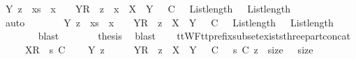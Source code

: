 \begin{isabellebody}
\ {\isachardoublequoteopen}{\isasymexists}Y\ z\ {\isasymrho}\ xs\ {\isacharat}\ {\isacharbrackleft}x{\isacharbrackright}\ {\isacharequal}\ {\isasymrho}\ {\isacharat}\ {\isacharbrackleft}{\isacharbrackleft}Y{\isacharbrackright}\isactrlsub R{\isacharbrackright}\ {\isacharat}\ z\ {\isacharat}\ {\isacharbrackleft}x{\isacharbrackright}\ {\isasymand}\ X\ {\isasymsubseteq}\ Y\ {\isasymand}\ {\isasymrho}\ {\isasymlesssim}\isactrlsub C\ {\isasymrho}\ {\isasymand}\ List{\isachardot}length\ {\isasymrho}\ {\isacharequal}\ List{\isachardot}length\ {\isasymrho}{\isachardoublequoteclose}\isanewline
\ \ \ \ \ \ \isamarkupfalse%
\ auto\isanewline
\ \ \ \ \isamarkupfalse%
\ \isamarkupfalse%
\ {\isachardoublequoteopen}{\isasymexists}Y\ z\ {\isasymrho}\ xs\ {\isacharat}\ {\isacharbrackleft}x{\isacharbrackright}\ {\isacharequal}\ {\isasymrho}\ {\isacharat}\ {\isacharbrackleft}{\isacharbrackleft}Y{\isacharbrackright}\isactrlsub R{\isacharbrackright}\ {\isacharat}\ z\ {\isasymand}\ X\ {\isasymsubseteq}\ Y\ {\isasymand}\ {\isasymrho}\ {\isasymlesssim}\isactrlsub C\ {\isasymrho}\ {\isasymand}\ List{\isachardot}length\ {\isasymrho}\ {\isacharequal}\ List{\isachardot}length\ {\isasymrho}{\isachardoublequoteclose}\isanewline
\ \ \ \ \ \ \isamarkupfalse%
\ blast\isanewline
\ \ \ \ \isamarkupfalse%
\ \isamarkupfalse%
\ {\isacharquery}thesis\ \isamarkupfalse%
\ blast\isanewline
\ \ \isamarkupfalse%
\isanewline
{}\isamarkupfalse%
%
\endisatagproof
{\isafoldproof}%
%
\isadelimproof
\isanewline
%
\endisadelimproof
\isanewline
{}\isamarkupfalse%
\ ttWF{\isacharunderscore}tt{\isacharunderscore}prefix{\isacharunderscore}subset{\isacharunderscore}exists{\isacharunderscore}three{\isacharunderscore}part{\isacharunderscore}concat{\isacharcolon}\isanewline
\ \ \ {\isachardoublequoteopen}{\isasymrho}\ {\isacharat}\ {\isacharbrackleft}{\isacharbrackleft}X{\isacharbrackright}\isactrlsub R{\isacharbrackright}\ {\isacharat}\ s\ {\isasymlesssim}\isactrlsub C\ {\isasymsigma}{\isachardoublequoteclose}\isanewline
\ \ \ {\isachardoublequoteopen}{\isasymexists}Y\ z\ {\isasymrho}\ {\isasymsigma}\ {\isacharequal}\ {\isasymrho}\ {\isacharat}\ {\isacharparenleft}{\isacharbrackleft}{\isacharbrackleft}Y{\isacharbrackright}\isactrlsub R{\isacharbrackright}\ {\isacharat}\ z{\isacharparenright}\ {\isasymand}\ X\ {\isasymsubseteq}\ Y\ {\isasymand}\ {\isasymrho}\ {\isasymlesssim}\isactrlsub C\ {\isasymrho}\ {\isasymand}\ s\ {\isasymlesssim}\isactrlsub C\ z\ {\isasymand}\ size\ {\isasymrho}\ {\isacharequal}\ size\ {\isasymrho}{\isachardoublequoteclose}\isanewline

\end{isabellebody}
